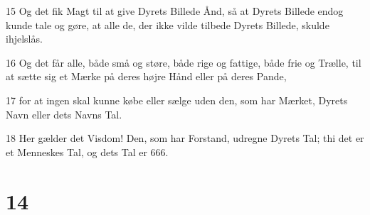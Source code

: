 \par 15 Og det fik Magt til at give Dyrets Billede Ånd, så at Dyrets Billede endog kunde tale og gøre, at alle de, der ikke vilde tilbede Dyrets Billede, skulde ihjelslås.
\par 16 Og det får alle, både små og støre, både rige og fattige, både frie og Trælle, til at sætte sig et Mærke på deres højre Hånd eller på deres Pande,
\par 17 for at ingen skal kunne købe eller sælge uden den, som har Mærket, Dyrets Navn eller dets Navns Tal.
\par 18 Her gælder det Visdom! Den, som har Forstand, udregne Dyrets Tal; thi det er et Menneskes Tal, og dets Tal er 666.

\chapter{14}

